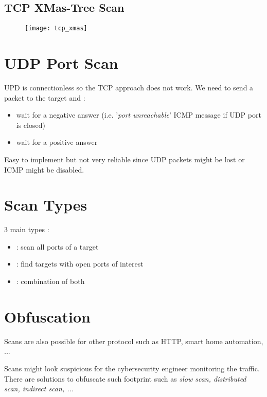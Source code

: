 \subsection{TCP XMas-Tree Scan}

\begin{figure}[H]
    \centering
    \texttt{[image: tcp\_xmas]}
\end{figure}

\section{UDP Port Scan}

UPD is connectionless so the TCP approach does not work. We need to send a packet to the target and :
\begin{itemize}
    \item wait for a negative answer (i.e. '\textit{port unreachable}' ICMP message if UDP port is closed)
    \item wait for a positive answer
\end{itemize}

Easy to implement but not very reliable since UDP packets might be lost or ICMP might be disabled.

\section{Scan Types}

3 main types :
\begin{itemize}
    \item {} : scan all ports of a target
    \item {} : find targets with open ports of interest
    \item {} : combination of both
\end{itemize}

\section{Obfuscation}

Scans are also possible for other protocol such as HTTP, smart home automation, ...

Scans might look suspicious for the cybersecurity engineer monitoring the traffic. There are solutions to obfuscate such footprint such as \textit{slow scan, distributed scan, indirect scan, ...}

